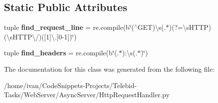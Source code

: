 \subsection*{Static Public Attributes}
\begin{DoxyCompactItemize}
\item 
\hypertarget{class_http_request_handler_1_1_http_request_handler_a60ad60b9b4b74a703ffeae8fb72fd9ca}{tuple {\bfseries find\-\_\-request\-\_\-line} = re.\-compile(b\char`\"{}($^\wedge$G\-E\-T)\textbackslash{}s(.$\ast$)(?=\textbackslash{}s\-H\-T\-T\-P)(\textbackslash{}s\-H\-T\-T\-P\textbackslash{}/)(\mbox{[}1\mbox{]}\textbackslash{}.\mbox{[}0-\/1\mbox{]})\char`\"{})}\label{class_http_request_handler_1_1_http_request_handler_a60ad60b9b4b74a703ffeae8fb72fd9ca}

\item 
\hypertarget{class_http_request_handler_1_1_http_request_handler_a550d250b1266add5a833b70137bb359d}{tuple {\bfseries find\-\_\-headers} = re.\-compile(b\char`\"{}(.$\ast$)\-:\textbackslash{}s(.$\ast$)\char`\"{})}\label{class_http_request_handler_1_1_http_request_handler_a550d250b1266add5a833b70137bb359d}

\end{DoxyCompactItemize}


The documentation for this class was generated from the following file\-:\begin{DoxyCompactItemize}
\item 
/home/ivan/\-Code\-Snippets-\/\-Projects/\-Telebid-\/\-Tasks/\-Web\-Server/\-Async\-Server/Http\-Request\-Handler.\-py\end{DoxyCompactItemize}
